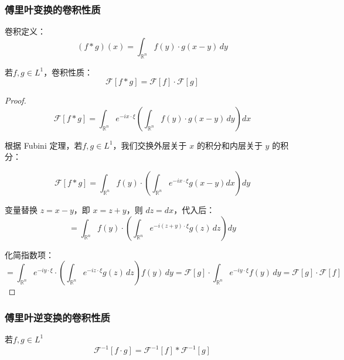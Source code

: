 \documentclass[12pt,a4paper]{article}
\numberwithin{subsection}{section}   %
\numberwithin{subsubsection}{subsection}
\theoremstyle{plain}
\theoremstyle{definition}
\theoremstyle{remark}
\theoremstyle{remark}
\begin{document}
	
	\subsubsection{傅里叶变换的卷积性质}
		卷积定义：
	\begin{equation}
		(f * g)(x) = \int_{\mathbb{R}^n} f(y) \cdot g(x - y) \, dy
	\end{equation}
	
	若\( f,g \in L^1 \)，卷积性质：
	\begin{equation}
		\mathcal{F}[f * g] = \mathcal{F}[f] \cdot \mathcal{F}[g]
	\end{equation}


		\begin{proof}
	\[	
		\mathcal{F}[f * g] = \int_{\mathbb{R}^n} e^{-i x \cdot \xi} \left( \int_{\mathbb{R}^n} f(y) \cdot g(x - y) \, dy \right) dx
	\]	
	
	
	根据 Fubini 定理，若\( f,g \in L^1 \)，我们交换外层关于 \(x\) 的积分和内层关于 \(y\) 的积分：
	
	\[
	\mathcal{F}[f * g] = \int_{\mathbb{R}^n} f(y) \cdot \left( \int_{\mathbb{R}^n} e^{-i x \cdot \xi} g(x - y) dx \right) dy
	\]
	
	变量替换 \( z = x - y \)，即 \( x = z + y \)，则 \( dz = dx \)，代入后：
	\[	
		= \int_{\mathbb{R}^n} f(y) \cdot \left( \int_{\mathbb{R}^n} e^{-i (z + y) \cdot \xi} g(z) \, dz \right) dy
	\]	
	
	化简指数项：
		\[	
		= \int_{\mathbb{R}^n} e^{-i y \cdot \xi} \cdot \left( \int_{\mathbb{R}^n} e^{-i z \cdot \xi} g(z) \, dz \right) f(y) \, dy	= \mathcal{F}[g] \cdot \int_{\mathbb{R}^n} e^{-i y \cdot \xi} f(y) \, dy = \mathcal{F}[g] \cdot \mathcal{F}[f]
	\]	
	
	
\end{proof}
	
		\subsubsection{傅里叶逆变换的卷积性质}
	若\( f,g \in L^1 \)
	\begin{equation}\label{nibianhuanjuanji}
		\mathcal{F}^{-1}[f \cdot g] = \mathcal{F}^{-1}[f] * \mathcal{F}^{-1}[g]
	\end{equation}
	
\end{document}
